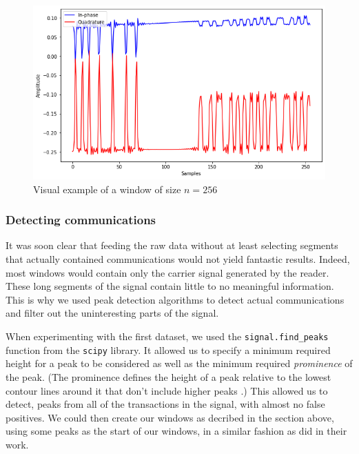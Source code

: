 \begin{figure}[htbp!]
  \centering
  \includegraphics[scale=0.55]{figures/dataprep_window.png}
  \caption{Visual example of a window of size $n = 256$}
  \label{fig:window}
\end{figure}

\subsubsection{Detecting communications}

It was soon clear that feeding the raw data without at least selecting segments that actually contained communications would not yield fantastic results. Indeed, most windows would contain only the carrier signal generated by the reader. These long segments of the signal contain little to no meaningful information. This is why we used peak detection algorithms to detect actual communications and filter out the uninteresting parts of the signal.

When experimenting with the first dataset, we used the \texttt{signal.find\_peaks} function from the \texttt{scipy} library. It allowed us to specify a minimum required height for a peak to be considered as well as the minimum required \textit{prominence} of the peak. (The prominence defines the height of a peak relative to the lowest contour lines around it that don't include higher peaks \cite{wiki_prominence_2020}.) This allowed us to detect, peaks from all of the transactions in the signal, with almost no false positives. We could then create our windows as decribed in the section above, using some peaks as the start of our windows, in a similar fashion as \textcite{youssef_machine_2017} did in their work.

